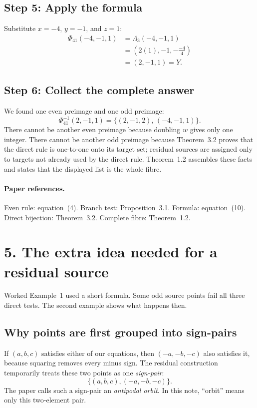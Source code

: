 \documentclass[11pt]{amsart}
\newcommand{\PhiMap}{\Phi_{41}}
\begin{document}
\subsection*{Step 5: Apply the formula}

Substitute \(x=-4\), \(y=-1\), and \(z=1\):
\[
\begin{aligned}
 \PhiMap(-4,-1,1)
 &=\Lambda_3(-4,-1,1)\\
 &=\left(2(1),-1,-\frac{-4}{4}\right)\\
 &=(2,-1,1)=Y.
\end{aligned}
\]

\subsection*{Step 6: Collect the complete answer}

We found one even preimage and one odd preimage:
\[
 \PhiMap^{-1}(2,-1,1)
 =\{(2,-1,2),\,(-4,-1,1)\}.
\]
There cannot be another even preimage because doubling \(w\) gives only one
integer.  There cannot be another odd preimage because Theorem~3.2 proves
that the direct rule is one-to-one onto its target set; residual sources are
assigned only to targets not already used by the direct rule.  Theorem~1.2
assembles these facts and states that the displayed list is the whole fibre.

\paragraph{Paper references.}
Even rule: equation~(4).  Branch test: Proposition~3.1.  Formula:
equation~(10).  Direct bijection: Theorem~3.2.  Complete fibre:
Theorem~1.2.

\newpage
\section*{5. The extra idea needed for a residual source}

Worked Example~1 used a short formula.  Some odd source points fail all three
direct tests.  The second example shows what happens then.

\subsection*{Why points are first grouped into sign-pairs}

If \((a,b,c)\) satisfies either of our equations, then
\((-a,-b,-c)\) also satisfies it, because squaring removes every minus sign.
The residual construction temporarily treats these two points as one
\emph{sign-pair}:
\[
 \{(a,b,c),(-a,-b,-c)\}.
\]
The paper calls such a sign-pair an \emph{antipodal orbit}.  In this note,
``orbit'' means only this two-element pair.
\end{document}

